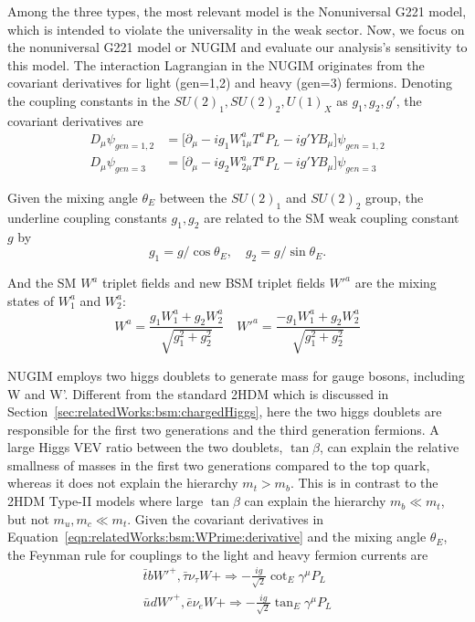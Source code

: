 Among the three types, the most relevant model is the Nonuniversal G221 model, which is intended to violate the universality in the weak sector. Now, we focus on the nonuniversal G221 model or NUGIM and evaluate our analysis's sensitivity to this model. The interaction Lagrangian in the NUGIM originates from the covariant derivatives for light (gen=1,2) and heavy (gen=3) fermions. Denoting the coupling constants in the $SU(2)_1 , SU(2)_2, U(1)_X$ as $g_1, g_2, g'$, the covariant derivatives are
\begin{equation}
\begin{split}
	D_\mu \psi_{gen=1,2} &= \big[ \partial_\mu -ig_1W^a_{1\mu} T^a P_L - ig'YB_\mu\big] \psi_{gen=1,2}  \\
    D_\mu \psi_{gen=3} &= \big[ \partial_\mu -ig_2W^a_{2\mu} T^a P_L - ig'YB_\mu\big] \psi_{gen=3} 
\end{split}
\label{eqn:relatedWorks:bsm:WPrime:derivative}
\end{equation}

\noindent Given the mixing angle $\theta_E$ between the $SU(2)_1$ and $SU(2)_2$ group, the underline coupling constants $g_1, g_2$ are related to the SM weak coupling constant $g$ by
\begin{equation}
	g_1=g/ \cos \theta_E, \quad g_2=g/ \sin \theta_E.
\end{equation}

\noindent And the SM $W^a$ triplet fields and new BSM triplet fields $W'^a$  are the mixing states of $W_1^a$ and $W_2^a$:
\begin{equation}
	W^a = \frac{g_1 W^a_1 + g_2 W_2^a}{\sqrt{g_1^2+g_2^2}} \quad W'^a = \frac{-g_1 W^a_1 + g_2 W_2^a}{\sqrt{g_1^2+g_2^2}}
\end{equation}

\noindent NUGIM employs two higgs doublets to generate mass for gauge bosons, including W and W'. Different from the standard 2HDM which is discussed in Section~\ref{sec:relatedWorks:bsm:chargedHiggs}, here the two higgs doublets are responsible for the first two generations and the third generation fermions. A large Higgs VEV ratio between the two doublets, $\tan \beta$, can explain the relative smallness of masses in the first two generations compared to the top quark, whereas it does not explain the hierarchy $m_t > m_b$. This is in contrast to the 2HDM Type-II models where large $\tan \beta$ can explain the hierarchy $m_b\ll m_t$, but not $m_u, m_c  \ll m_t$. Given the covariant derivatives in Equation~\ref{eqn:relatedWorks:bsm:WPrime:derivative} and the mixing angle $\theta_E$, the Feynman rule for \PWpr couplings \cite{Edelhauser:2014yra} to the light and heavy fermion currents are 
\begin{equation}
\begin{split}
	\bar{t} b W'^+ , \bar{\tau} \nu_\tau W+ \Longrightarrow -\frac{i g}{\sqrt{2}} \cot_E \gamma^\mu P_L \\
    \bar{u} d W'^+ , \bar{e} \nu_e W+ \Longrightarrow -\frac{i g}{\sqrt{2}} \tan_E \gamma^\mu P_L
\end{split}
\label{eqn:relatedWorks:bsm:WPrime:feynmanRule}
\end{equation}

